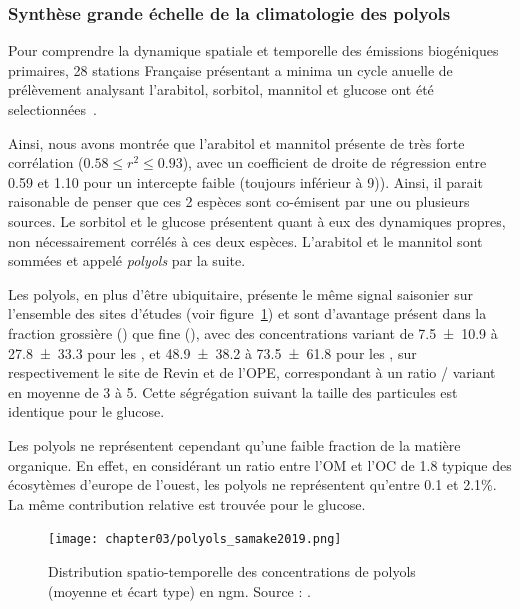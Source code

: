 \subsubsection{Synthèse grande échelle de la climatologie des polyols}%
\label{ssub:synthèse_grande_échelle_de_la_climatologie_des_polyols}

Pour comprendre la dynamique spatiale et temporelle des émissions biogéniques primaires,
28 stations Française présentant a minima un cycle anuelle de prélèvement analysant
l'arabitol, sorbitol, mannitol et glucose ont été
selectionnées~\autocite{samakePolyols2019}.

Ainsi, nous avons montrée que l'arabitol et mannitol présente de très forte corrélation 
($0.58 \leq r^2 \leq 0.93$), avec un coefficient de droite de régression entre 0.59 et 1.10 pour un
intercepte faible (toujours inférieur à \SI{9}{\ugm})). Ainsi, il parait raisonable de
penser que ces 2 espèces sont co-émisent par une ou plusieurs sources.
Le sorbitol et le glucose présentent quant à eux des dynamiques propres, non nécessairement corrélés à ces
deux espèces.
L'arabitol et le mannitol sont sommées et appelé \textit{polyols} par la suite.

Les polyols, en plus d'être ubiquitaire, présente le même signal saisonier sur l'ensemble
des sites d'études (voir figure~\ref{fig:polyols_samake2019}) et sont d'avantage présent
dans la fraction grossière (\PMdix) que fine (\PMdc), avec des concentrations variant de 
\SI{7.5\pm10.9}{\ngm} à \SI{27.8\pm33.3}{\ngm} pour les \PMdc, et
\SI{48.9\pm38.2}{\ngm} à \SI{73.5\pm61.8}{\ngm} pour les \PMdix, sur respectivement le site de
Revin et de l'OPE, correspondant à un ratio \PMdix/\PMdc{} variant en moyenne de 3 à 5.
Cette ségrégation suivant la taille des particules est identique pour le glucose.

Les polyols ne représentent cependant qu'une faible fraction de la matière organique. En effet, en
considérant un ratio entre l'OM et l'OC de 1.8 typique des écosytèmes d'europe de
l'ouest, les polyols ne représentent qu'entre 0.1 et 2.1\%. La même contribution relative
est trouvée pour le glucose.

\begin{figure}[ht]
    \centering
    \texttt{[image: chapter03/polyols\_samake2019.png]}
    \caption{
        Distribution spatio-temporelle des concentrations de polyols (moyenne et écart
        type) en \si{ngm}.
        Source : \cite[figure 6]{samakePolyols2019}.
    }%
    \label{fig:polyols_samake2019}
\end{figure}


